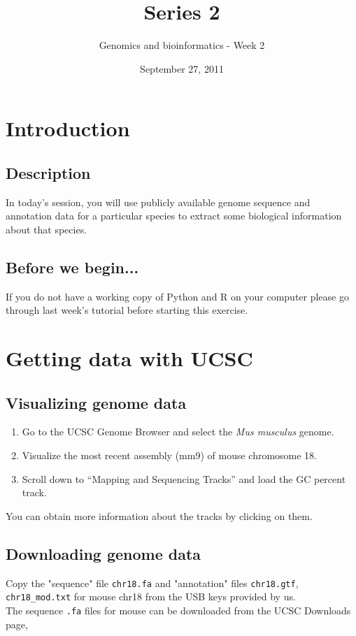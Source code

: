 \documentclass[a4paper,11pt]{article}
\title{Series 2}
\date{September 27, 2011}
\author{Genomics and bioinformatics - Week 2}
\begin{document}
\maketitle



\section{Introduction}
\subsection{Description}
In today's session, you will use publicly available genome sequence and annotation data for a particular species
to extract some biological information about that species.
\subsection{Before we begin...}
If you do not have a working copy of Python and R on your computer please go through last week's tutorial before starting this exercise.



\section{Getting data with UCSC}
\subsection{Visualizing genome data}
\begin{enumerate}
\item Go to the UCSC Genome Browser and select the \textit{Mus musculus} genome.
\item Visualize the most recent assembly (mm9) of mouse chromosome 18.
\item Scroll down to ``Mapping and Sequencing Tracks'' and load the GC percent track.
\end{enumerate}
 You can obtain more information about the tracks by clicking on them.
\subsection{Downloading genome data}
Copy the "sequence" file \texttt{chr18.fa} and "annotation" files \texttt{chr18.gtf}, \texttt{chr18\_mod.txt} for mouse chr18 from the USB keys provided by us.\\

The sequence \texttt{.fa} files for mouse can be downloaded from the UCSC Downloads page,
\end{document}
